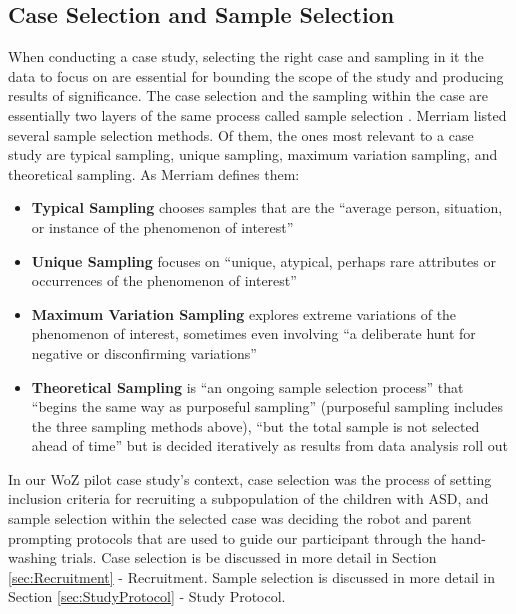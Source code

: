 \subsection{Case Selection and Sample Selection}
\label{sec:CaseSelectionAndSampleSelection}
When conducting a case study, selecting the right case and sampling in it the data to focus on are essential for bounding the scope of the study and producing results of significance.  The case selection and the sampling within the case are essentially two layers of the same process called sample selection \cite{merriam2014qualitative}.  Merriam \cite{merriam2014qualitative} listed several sample selection methods.  Of them, the ones most relevant to a case study are typical sampling, unique sampling, maximum variation sampling, and theoretical sampling. As Merriam defines them:
\begin{itemize}
	\item \textbf{Typical Sampling} chooses samples that are the ``average person, situation, or instance of the phenomenon of interest''
	\item \textbf{Unique Sampling} focuses on ``unique, atypical, perhaps rare attributes or occurrences of the phenomenon of interest''
	\item \textbf{Maximum Variation Sampling} explores extreme variations of the phenomenon of interest, sometimes even involving ``a deliberate hunt for negative or disconfirming variations''
	\item \textbf{Theoretical Sampling}  is ``an ongoing sample selection process'' that ``begins the same way as purposeful sampling'' (purposeful sampling includes the three sampling methods above), ``but the total sample is not selected ahead of time'' but is decided iteratively as results from data analysis roll out
\end{itemize}

In our WoZ pilot case study's context, case selection was the process of setting inclusion criteria for recruiting a subpopulation of the children with ASD, and sample selection within the selected case was deciding the robot and parent prompting protocols that are used to guide our participant through the hand-washing trials.  Case selection is be discussed in more detail in Section \ref{sec:Recruitment} - Recruitment.  Sample selection is discussed in more detail in Section \ref{sec:StudyProtocol} - Study Protocol.


